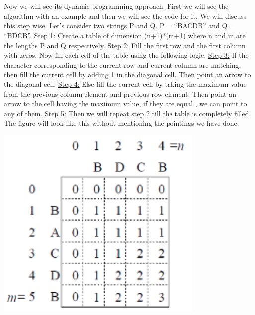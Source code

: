 \documentclass[12pt]{book}
\begin{document}
\\\\

Now we will see its dynamic programming approach.\newline
First we will see the algorithm with an example and then we will see the code for it.
We will discuss this step wise.\newline
Let’s consider two strings P and Q. P = “BACDB” and Q = “BDCB”.\newline\newline
\underline{Step 1:} Create a table of dimension (n+1)*(m+1) where n and m are the lengths P and Q respectively.\newline\newline
\underline{Step 2:}  Fill the first row and the first column with zeros. Now fill each cell of the table using the following logic.\newline\newline
\underline{Step 3:} If the character corresponding to the current row and current column are matching, then fill the current cell by adding 1 in the diagonal cell. Then point an arrow to the diagonal cell.\newline\newline
\underline{Step 4:} Else fill the current cell by taking the maximum value from the previous column element and previous row element. Then point an arrow to the cell having the maximum value, if they are equal , we can point to any of them.\newline\newline
\underline{Step 5:} Then we will repeat step 2 till the table is completely filled.
The figure will look like this without mentioning the pointings we have done.\newline\newline
\begin{center}
    \includegraphics[width =10cm]{LCS-1.png}    
\end{center}
\end{document}
